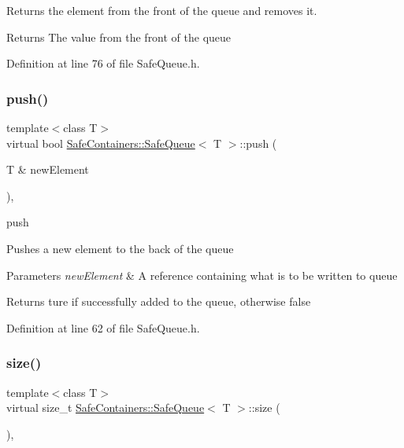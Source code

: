 Returns the element from the front of the queue and removes it. 

\begin{DoxyReturn}{Returns}
The value from the front of the queue 
\end{DoxyReturn}


Definition at line 76 of file Safe\+Queue.\+h.

\mbox{\label{classSafeContainers_1_1SafeQueue_acfc992d0de4affd870cb10e59a2a9cdf}} 
\subsubsection{\texorpdfstring{push()}{push()}}
{\footnotesize\ttfamily template$<$class T$>$ \\
virtual bool \mbox{\hyperlink{classSafeContainers_1_1SafeQueue}{Safe\+Containers\+::\+Safe\+Queue}}$<$ T $>$\+::push (\begin{DoxyParamCaption}\item[{T \&}]{new\+Element }\end{DoxyParamCaption})\hspace{0.3cm}{\ttfamily [inline]}, {\ttfamily [virtual]}}



push 

Pushes a new element to the back of the queue


\begin{DoxyParams}{Parameters}
{\em new\+Element} & A reference containing what is to be written to queue\\
\hline
\end{DoxyParams}
\begin{DoxyReturn}{Returns}
ture if successfully added to the queue, otherwise false 
\end{DoxyReturn}


Definition at line 62 of file Safe\+Queue.\+h.

\mbox{\label{classSafeContainers_1_1SafeQueue_a1dec91dd07140277a71ddfffd65565df}} 
\subsubsection{\texorpdfstring{size()}{size()}}
{\footnotesize\ttfamily template$<$class T$>$ \\
virtual size\+\_\+t \mbox{\hyperlink{classSafeContainers_1_1SafeQueue}{Safe\+Containers\+::\+Safe\+Queue}}$<$ T $>$\+::size (\begin{DoxyParamCaption}{ }\end{DoxyParamCaption})\hspace{0.3cm}{\ttfamily [inline]}, {\ttfamily [virtual]}}



